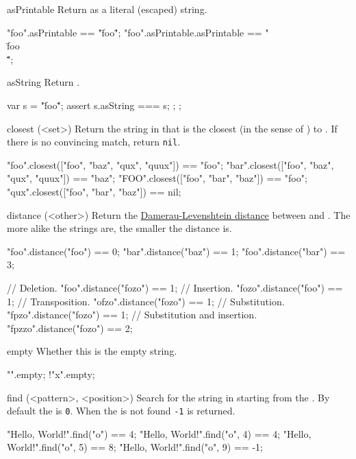 \begin{urbiscriptapi}
\item[asPrintable]
  Return \this as a literal (escaped) string.
\begin{urbiassert}
"foo".asPrintable == "\"foo\"";
"foo".asPrintable.asPrintable == "\"\\\"foo\\\"\"";
\end{urbiassert}


\item[asString]
  Return \this.
\begin{urbiscript}
{
  var s = "\"foo\"";
  assert { s.asString === s; };
};
\end{urbiscript}


\item[closest](<set>)%
  Return the string in  that is the closest (in the sense of
  ) to \this.  If there is no convincing match,
  return \lstinline|nil|.
\begin{urbiassert}
"foo".closest(["foo", "baz", "qux", "quux"]) == "foo";
"bar".closest(["foo", "baz", "qux", "quux"]) == "baz";
"FOO".closest(["foo", "bar", "baz"])         == "foo";
"qux".closest(["foo", "bar", "baz"])         == nil;
\end{urbiassert}


\item[distance](<other>)%
  Return the
  \href{http://en.wikipedia.org/wiki/Damerau-Levenshtein_distance}
  {Damerau-Levenshtein distance} between \this and
  .  The more alike the strings are, the smaller the
  distance is.
\begin{urbiassert}
"foo".distance("foo") == 0;
"bar".distance("baz") == 1;
"foo".distance("bar") == 3;

// Deletion.
"foo".distance("fozo") == 1;
// Insertion.
"fozo".distance("foo") == 1;
// Transposition.
"ofzo".distance("fozo") == 1;
// Substitution.
"fpzo".distance("fozo") == 1;
// Substitution and insertion.
"fpzzo".distance("fozo") == 2;
\end{urbiassert}


\item[empty] Whether this is the empty string.
\begin{urbiassert}
  "".empty;
!"x".empty;
\end{urbiassert}


\item[find](<pattern>, <position>)%
  Search for the  string in \this starting from the
  .  By default the  is \lstinline|0|.  When the
   is not found \lstinline|-1| is returned.
\begin{urbiassert}
"Hello, World!".find("o") == 4;
"Hello, World!".find("o", 4) == 4;
"Hello, World!".find("o", 5) == 8;
"Hello, World!".find("o", 9) == -1;
\end{urbiassert}



\end{urbiscriptapi}
